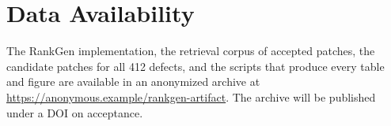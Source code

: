 \section*{Data Availability}
The RankGen implementation, the retrieval corpus of accepted patches, the candidate patches
for all 412 defects, and the scripts that produce every table and figure are available in an
anonymized archive at \url{https://anonymous.example/rankgen-artifact}. The archive will be
published under a DOI on acceptance.
